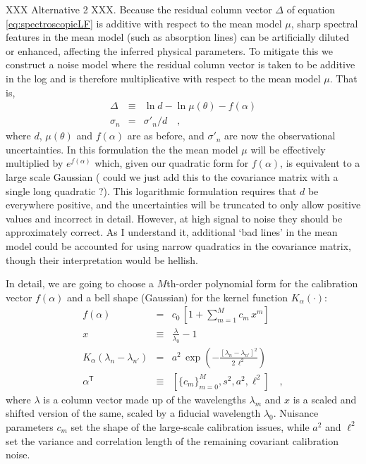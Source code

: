 \documentclass[iop,numberedappendix]{emulateapj}
\newcommand{\transpose}[1]{{#1}^{\!\mathsf T}}
\begin{document}
XXX Alternative 2 XXX.
Because the residual column vector $\Delta$ of equation
\ref{eq:spectroscopicLF} is additive with respect to the mean model
$\mu$, sharp spectral features in the mean model (such as absorption
lines) can be artificially diluted or enhanced, affecting the inferred
physical parameters. To mitigate this we construct a noise model where the
residual column vector is taken to be additive in the log and is
therefore multiplicative with respect to the mean model $\mu$.  That
is,
\begin{eqnarray}\label{eq:spectroscopicLFalt2} 
\Delta &\equiv&
\ln d - \ln \mu(\theta) - f(\alpha) \\
\sigma_{n} & = & \sigma'_n / d
\quad ,
\end{eqnarray}
where $d$, $\mu(\theta)$ and $f(\alpha)$ are as before, and
$\sigma'_{n}$ are now the observational uncertainties. In this
formulation the the mean model $\mu$ will be effectively multiplied by
$e ^{f(\alpha)}$ which, given our quadratic form for $f(\alpha)$, is
equivalent to a large scale Gaussian ({\color{red} could we just add
this to the covariance matrix with a single long quadratic ?}).  This
logarithmic formulation requires that $d$ be everywhere positive, and
the uncertainties will be truncated to only allow positive values and
incorrect in detail.  However, at high signal to noise they should be
approximately correct. {\color{red} As I understand it, additional
`bad lines' in the mean model could be accounted for using narrow
quadratics in the covariance matrix, though their interpretation would
be hellish.}

In detail, we are going to choose a $M$th-order polynomial form for
the calibration vector $f(\alpha)$ and a bell shape (Gaussian) for the
kernel function $K_\alpha(\cdot)$:
\begin{eqnarray}\displaystyle
f(\alpha) &=& c_0\,[1 + \sum_{m=1}^M c_m\,x^m]
\\
x &\equiv& \frac{\lambda}{\lambda_0} - 1
\\
K_\alpha(\lambda_n - \lambda_{n'}) &=& a^2\,\exp(-\frac{[\lambda_n - \lambda_{n'}]^2}{2\,\ell^2})
\\
\transpose{\alpha} &\equiv& \left[ \{c_m\}_{m=0}^M, s^2, a^2, \ell^2 \right]
\quad ,
\end{eqnarray}
where $\lambda$ is a column vector made up of the wavelengths $\lambda_m$
and $x$ is a scaled and shifted version of the same,
scaled by a fiducial wavelength $\lambda_0$.
Nuisance parameters $c_m$ set the shape of the large-scale calibration
issues, while $a^2$ and $\ell^2$ set the variance and correlation
length of the remaining covariant calibration noise.
\end{document}
